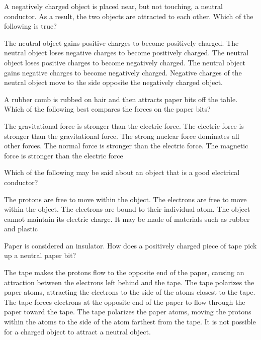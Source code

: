 \documentclass{../../../oss-ap12ibhl-print}
\begin{document}
\begin{questions}
  \question A negatively charged object is placed near, but not touching, a
  neutral conductor. As a result, the two objects are attracted to each other.
  Which of the following is true?
  \begin{choices}
    \choice The neutral object gains positive charges to become positively
    charged.
    \choice The neutral object loses negative charges to become positively
    charged.
    \choice The neutral object loses positive charges to become negatively
    charged.
    \choice The neutral object gains negative charges to become negatively
    charged.
    \choice Negative charges of the neutral object move to the side opposite
    the negatively charged object.
  \end{choices}

  \question A rubber comb is rubbed on hair and then attracts paper bits off the
  table. Which of the following best compares the forces on the paper bits?
  \begin{choices}
    \choice The gravitational force is stronger than the electric force.
    \choice The electric force is stronger than the gravitational force.
    \choice The strong nuclear force dominates all other forces.
    \choice The normal force is stronger than the electric force.
    \choice The magnetic force is stronger than the electric force
  \end{choices}

  \question Which of the following may be said about an object that is a good
  electrical conductor?
  \begin{choices}
    \choice The protons are free to move within the object.
    \choice The electrons are free to move within the object.
    \choice The electrons are bound to their individual atom.
    \choice The object cannot maintain its electric charge.
    \choice It may be made of materials such as rubber and plastic
  \end{choices}
  
  \question Paper is considered an insulator. How does a positively charged
  piece of tape pick up a neutral paper bit?
  \begin{choices}
    \choice The tape makes the protons flow to the opposite end of the paper,
    causing an attraction between the electrons left behind and the tape.
    \choice The tape polarizes the paper atoms, attracting the electrons to the
    side of the atoms closest to the tape.
    \choice The tape forces electrons at the opposite end of the paper to flow
    through the paper toward the tape.
    \choice The tape polarizes the paper atoms, moving the protons within the
    atoms to the side of the atom farthest from the tape.
    \choice It is not possible for a charged object to attract a neutral object.
  \end{choices}


\end{questions}
\end{document}
